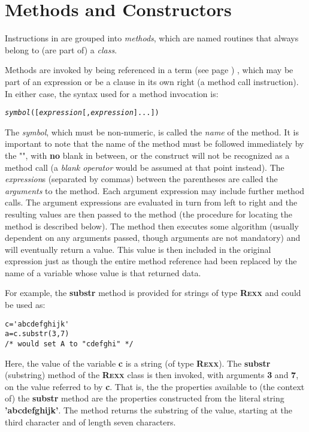 \chapter{Methods and Constructors}\label{refmethcon}
\index{,}
 
Instructions in \nr{} are grouped into \emph{methods}, which are
named routines that always belong to (are part of) a \emph{class}.
 
Methods are invoked by being referenced in a  term (see page \pageref{refterms}) ,
which may be part of an expression or be a clause in its own right (a
method call instruction).
In either case, the syntax used for a method invocation is:
\begin{shaded}
\begin{alltt}
\emph{symbol}([\emph{expression}[,\emph{expression}]...])
\end{alltt}
\end{shaded}
 The \emph{symbol}, which must be non-numeric, is called the
\emph{name} of the method.
It is important to note that the name of the method must be followed
immediately by the "\keyword{(}", with \textbf{no} blank in
between, or the construct will not be recognized as a method call
(a \emph{blank operator} would be assumed at that point instead).
 The \emph{expression}s (separated by commas) between the
parentheses are called the \emph{arguments} to the method.
Each argument expression may include further method calls.
 The argument expressions are evaluated in turn from left to right
and the resulting values are then passed to the method (the procedure
for locating the method is described below).
The method then executes some algorithm (usually dependent on any
arguments passed, though arguments are not mandatory) and will
eventually return a value.
This value is then included in the original expression just as though
the entire method reference had been replaced by the name of a variable
whose value is that returned data.
 
For example, the \textbf{substr} method is provided for strings of
type \textbf{R\textsc{exx}} and could be used as:
\begin{lstlisting}
c='abcdefghijk'
a=c.substr(3,7)
/* would set A to "cdefghi" */
\end{lstlisting}
Here, the value of the variable \textbf{c} is a string (of
type \textbf{R\textsc{exx}}).
The \textbf{substr} (substring) method of the \textbf{R\textsc{exx}} class is
then invoked, with arguments \textbf{3} and \textbf{7}, on the value
referred to by \textbf{c}.
That is, the the properties available to (the context of)
the \textbf{substr} method are the properties constructed from the
literal string \textbf{'abcdefghijk'}.
The method returns the substring of the value, starting at the third
character and of length seven characters.
 
